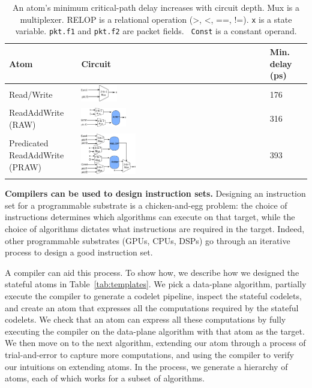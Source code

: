 \begin{table}[!t]
  \begin{scriptsize}
    \begin{tabular}{|p{}|p{}|p{}|}
  \hline
  Atom & Circuit & Min. delay (ps) \\
  \hline
  Read/Write & \centering\includegraphics[width=0.2\textwidth]{domino_rw.pdf} & 176 \\
  \hline
  ReadAddWrite (RAW) & \centering\includegraphics[width=0.25\textwidth]{domino_raw.pdf} & 316\\
  \hline
  \pbox{0.1\textwidth}
  {Predicated\\
  ReadAddWrite (PRAW)} & \centering\includegraphics[width=0.3\textwidth]{domino_pred_raw.pdf}  & 393 \\
  \hline
  \end{tabular}
\end{scriptsize}
\caption{An atom's minimum critical-path delay increases with circuit depth.
Mux is a multiplexer. RELOP is a relational operation (>, <, ==, !=). {\tt x}
is a state variable. {\tt pkt.f1} and {\tt pkt.f2} are packet fields. {\tt
Const} is a constant operand.}
\label{tab:circuits}
\end{table}

\medskip
\noindent
\textbf{Compilers can be used to design instruction sets.}
Designing an instruction set for a programmable substrate is a chicken-and-egg
problem: the choice of instructions determines which algorithms can execute on
that target, while the choice of algorithms dictates what instructions are
required in the target. Indeed, other programmable substrates (GPUs, CPUs,
DSPs) go through an iterative process to design a good instruction set.

 A compiler can aid this process. To show how, we describe how we
designed the stateful atoms in Table~\ref{tab:templates}. We pick a data-plane
algorithm, partially execute the \pktlanguage compiler to generate a codelet pipeline,
inspect the stateful codelets, and create an atom that expresses
all the computations required by the stateful codelets. We check that an atom
can express all these computations by fully executing the compiler on the
data-plane algorithm with that atom as the target. We then move on to the next
algorithm, extending our atom through a process of trial-and-error to capture
more computations, and using the compiler to verify our intuitions on extending
atoms. In the process,  we generate a hierarchy of atoms, each of which works
for a subset of algorithms.

